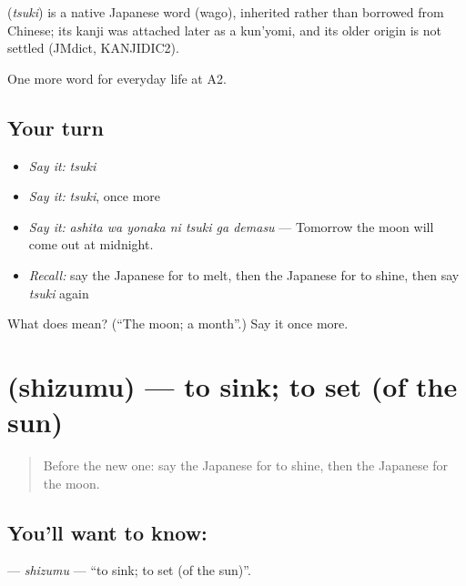 \begin{cousinweb}
\textbf{} (\emph{tsuki}) is a native Japanese word (wago), inherited rather than borrowed from Chinese; its kanji was attached later as a kun'yomi, and its older origin is not settled (JMdict, KANJIDIC2).
\end{cousinweb}

\begin{grammarlens}[title={What you've built}]
One more word for everyday life at A2.
\end{grammarlens}

\subsection*{Your turn}
\begin{itemize}
\raggedright
  \item \emph{Say it:} \emph{tsuki}
  \item \emph{Say it:} \emph{tsuki}, once more
  \item \emph{Say it:} \emph{ashita wa yonaka ni tsuki ga demasu} — Tomorrow the moon will come out at midnight.
  \item \emph{Recall:} say the Japanese for to melt, then the Japanese for to shine, then say \emph{tsuki} again
\end{itemize}

\begin{tcolorbox}[breakable,colback=teal!4,colframe=teal!35!black,title={Before you move on}]
What does  mean? (\textquotedblleft{}The moon; a month\textquotedblright{}.) Say it once more.
\end{tcolorbox}
\section[\texorpdfstring{\ja{しずむ} (shizumu)}{しずむ (shizumu)}]{ (shizumu) — to sink; to set (of the sun)}

\label{lesson:JA-C213-shizumu}



\begin{quote}
Before the new one: say the Japanese for to shine, then the Japanese for the moon.
\end{quote}

\subsection*{You'll want to know: }
\textbf{} — \emph{shizumu} — \textquotedblleft{}to sink; to set (of the sun)\textquotedblright{}.

